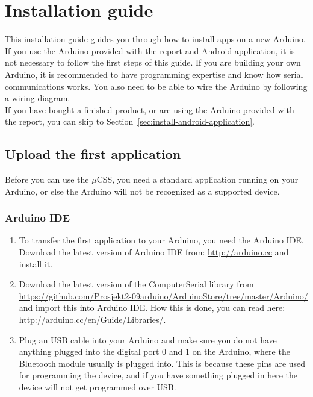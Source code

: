 \chapter{Installation guide}
This installation guide guides you through how to install apps on a new Arduino. If you use the Arduino provided with the report and Android application, it is not necessary to follow the first steps of this guide. If you are building your own Arduino, it is recommended to have programming expertise and know how serial communications works. You also need to be able to wire the Arduino by following a wiring diagram. \\

If you have bought a finished product, or are using the Arduino provided with the report, you can skip to Section~\ref{sec:install-android-application}.

	\section{Upload the first application}
	Before you can use the $\mu$CSS, you need a standard application running on your Arduino, or else the Arduino will not be recognized as a supported device.
	
		\subsection{Arduino IDE}
		\begin{enumerate}
		\item To transfer the first application to your Arduino, you need the Arduino IDE. Download the latest version of Arduino IDE from: \url{http://arduino.cc} and install it.
	
		\item Download the latest version of the ComputerSerial library from \url{https://github.com/Prosjekt2-09arduino/ArduinoStore/tree/master/Arduino/} and import this into Arduino IDE. How this is done, you can read here: \url{http://arduino.cc/en/Guide/Libraries/}.
	
		\item Plug an USB cable into your Arduino and make sure you do not have anything plugged into the digital port 0 and 1 on the Arduino, where the Bluetooth module usually is plugged into. This is because these pins are used for programming the device, and if you have something plugged in here the device will not get programmed over USB.
		\end{enumerate}
		
